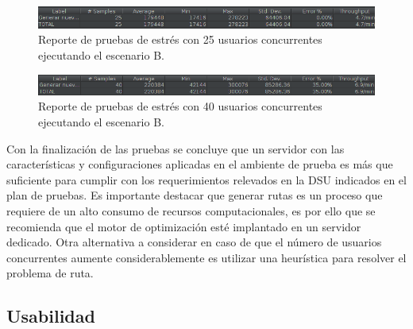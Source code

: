 \begin{figure}[H]
    \centering
    \includegraphics[width=\textwidth]{25_usuarios_generar_ruta.png}
    \caption{Reporte de pruebas de estrés con 25 usuarios concurrentes ejecutando el escenario B.}
    \label{fig:25UsuariosEstresB}
\end{figure}

\begin{figure}[H]
    \centering
    \includegraphics[width=\textwidth]{40_usuarios_plan_b_.png}
    \caption{Reporte de pruebas de estrés con 40 usuarios concurrentes ejecutando el escenario B.}
    \label{fig:40UsuariosEstresB}
\end{figure}

Con la finalización de las pruebas se concluye que un servidor con las características y configuraciones aplicadas en el ambiente de prueba es más que suficiente para cumplir con los requerimientos relevados en la DSU indicados en el plan de pruebas. Es importante destacar que generar rutas es un proceso que requiere de un alto consumo de recursos computacionales, es por ello que se recomienda que el motor de optimización esté implantado en un servidor dedicado. Otra alternativa a considerar en caso de que el número de usuarios concurrentes aumente considerablemente es utilizar una heurística para resolver el problema de ruta.

\subsection{Usabilidad}



